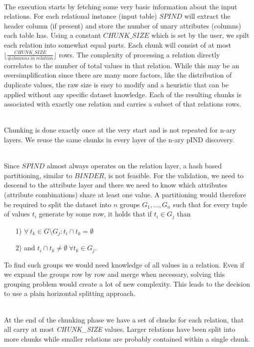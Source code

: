 \noindent \\ The execution starts by fetching some very basic information about the input relations. For each relational instance (input table) $SPIND$ will extract the header column (if present) and store the number of unary attributes (columns) each table has. Using a constant $CHUNK\_SIZE$ which is set by the user, we spilt each relation into somewhat equal parts. Each chunk will consist of at most $\lfloor \frac{CHUNK\_SIZE}{\# cloumns \: in \: relation} \rfloor$ rows. The complexity of processing a relation directly correlates to the number of total values in that relation. While this may be an oversimplification since there are many more factors, like the distribution of duplicate values, the raw size is easy to modify and a heuristic that can be applied without any specific dataset knowledge. Each of the resulting chunks is associated with exactly one relation and carries a subset of that relations rows.

\noindent \\ Chunking is done exactly once at the very start and is not repeated for n-ary layers. We reuse the same chunks in every layer of the n-ary pIND discovery.

\noindent \\ Since $SPIND$ almost always operates on the relation layer, a hash based partitioning, similar to $BINDER$, is not feasible. For the validation, we need to descend to the attribute layer and there we need to know which attributes (attribute combinations) share at least one value. A partitioning would therefore be required to split the dataset into $n$ groups $G_1, \dots, G_n$ such that for every tuple of values $t_i$ generate by some row, it holds that if $t_i \in G_j$ than 
\begin{itemize}
    \item[1)] $\forall \: t_k \in G \setminus G_j : t_i \cap t_k = \emptyset$
    \item[2)] and $t_i \cap t_k \not = \emptyset \: \forall t_k \in G_j$.
\end{itemize}
To find such groups we would need knowledge of all values in a relation. Even if we expand the groups row by row and merge when necessary, solving this grouping problem would create a lot of new complexity. This leads to the decision to use a plain horizontal splitting approach.

\noindent \\ At the end of the chunking phase we have a set of chucks for each relation, that all carry at most \textit{CHUNK\_SIZE} values. Larger relations have been split into more chunks while smaller relations are probably contained within a single chunk.

